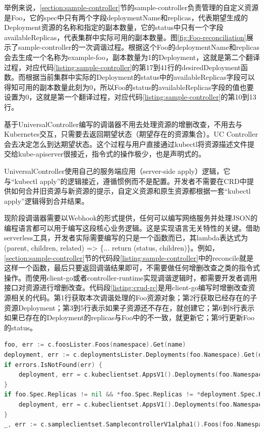 \documentclass[macfonts,master]{njuthesis}
\begin{document}
举例来说，\ref{section:sample-controller}节的sample-controller负责管理的自定义资源是Foo，它的spec中只有两个字段deploymentName和replicas，代表期望生成的Deployment资源的名称和指定的副本数量，它的status中只有一个字段availableReplicas，代表集群中实际可用的副本数量。图\ref{fig:Foo-reconciliation}展示了sample-controller的一次调谐过程。根据这个Foo的deploymentName和replicas会去生成一个名称为example-foo，副本数量为1的Deployment，这就是第二个翻译过程，对应代码\ref{listing:sample-controller}的第17到41行的desiredDeployment函数。而根据当前集群中实际的Deployment的status中的availableReplicas字段可以得知可用的副本数量此刻为0，所以Foo的status的availableReplicas字段的值也要设置为0，这就是第一个翻译过程，对应代码\ref{listing:sample-controller}的第10到13行。

基于UniversalController编写的调谐器不用去处理资源的增删改查，不用去与Kubernetes交互，只需要去返回期望状态（期望存在的资源集合）。UC Controller会去决定怎么到达期望状态。这个过程与用户直接通过kubectl将资源描述文件提交给kube-apiserver很接近，指令式的操作极少，也是声明式的。

UniversalController使用自己的服务端应用（server-side apply）逻辑，它与``kubectl apply''的逻辑接近，遵循惯例而不是配置。开发者不需要在CRD中提供如何合并旧资源与新资源的提示，自定义资源和原生资源都根据一套``kubectl apply''逻辑得到合并结果。

现阶段调谐器需要以Webhook的形式提供，任何可以编写网络服务并处理JSON的编程语言都可以用于编写这段核心业务逻辑。这是实现语言无关特性的关键。借助serverless工具，开发者实际需要编写的只是一个函数而已，其lambda表达式为(parent, children, related) => \{... return (status, children)\}。例如，\ref{section:sample-controller}节的代码段\ref{listing:sample-controller}中的reconcile就是这样一个函数，最后只要返回调谐结果即可，不需要做任何增删改查之类的指令式操作。而使用client-go或者controller-runtime实现调谐逻辑时，都需要开发者调用接口对资源进行增删改查。代码段\ref{listing:crud-rc}是用client-go编写时增删改查资源相关的代码。第1行获取本次调谐处理的Foo资源对象；第2行获取已经存在的子资源Deployment；第3到5行表示如果子资源还不存在，就创建它；第6到8行表示如果已存在的Deployment的replicas与Foo中的不一致，就更新它；第9行更新Foo的status。
\begin{lstlisting}[language=Go,caption=sample-controller中对资源进行增删改查的代码段,label=listing:crud-rc]
foo, err := c.foosLister.Foos(namespace).Get(name)
deployment, err := c.deploymentsLister.Deployments(foo.Namespace).Get(deploymentName)
if errors.IsNotFound(err) {
    deployment, err = c.kubeclientset.AppsV1().Deployments(foo.Namespace).Create(context.TODO(), newDeployment(foo), metav1.CreateOptions{})
}
if foo.Spec.Replicas != nil && *foo.Spec.Replicas != *deployment.Spec.Replicas {
    deployment, err = c.kubeclientset.AppsV1().Deployments(foo.Namespace).Update(context.TODO(), newDeployment(foo), metav1.UpdateOptions{})
}
_, err := c.sampleclientset.SamplecontrollerV1alpha1().Foos(foo.Namespace).Update(context.TODO(), fooCopy, metav1.UpdateOptions{})
\end{lstlisting}
\end{document}

